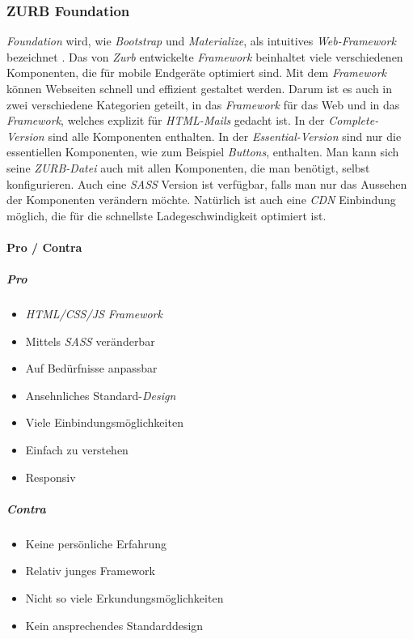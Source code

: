 		\subsubsection{ZURB Foundation}
		\label{chapter:study-frontend-frameworks-foundation}
		\textit{Foundation} wird, wie \textit{Bootstrap} und \textit{Materialize}, als intuitives \textit{Web-Framework} bezeichnet \cite{foundation-intro}. Das von \textit{Zurb} entwickelte \textit{Framework} beinhaltet viele verschiedenen Komponenten, die für mobile Endgeräte optimiert sind. Mit dem \textit{Framework} können Webseiten schnell und effizient gestaltet werden. Darum ist es auch in zwei verschiedene Kategorien geteilt, in das \textit{Framework} für das Web und in das \textit{Framework}, welches explizit für \textit{HTML-Mails} gedacht ist. In der \textit{Complete-Version} sind alle Komponenten enthalten. In der \textit{Essential-Version} sind nur die essentiellen Komponenten, wie zum Beispiel \textit{Buttons}, enthalten. Man kann sich seine \textit{ZURB-Datei} auch mit allen Komponenten, die man benötigt, selbst konfigurieren. Auch eine \textit{SASS} Version ist verfügbar, falls man nur das Aussehen der Komponenten verändern möchte. Natürlich ist auch eine \textit{CDN} Einbindung möglich, die für die schnellste Ladegeschwindigkeit optimiert ist.
		\paragraph{Pro / Contra}
		\subparagraph{Pro}
		\begin{itemize}
			\item \textit{HTML/CSS/JS Framework}
			\item Mittels \textit{SASS} veränderbar
			\item Auf Bedürfnisse anpassbar
			\item Ansehnliches Standard-\textit{Design} 
			\item Viele Einbindungsmöglichkeiten
			\item Einfach zu verstehen
			\item Responsiv
		\end{itemize}
	\label{list:zurbpro}
		\subparagraph{Contra}
		\begin{itemize}
			\item Keine persönliche Erfahrung
			\item Relativ junges Framework
			\item Nicht so viele Erkundungsmöglichkeiten
			\item Kein ansprechendes Standarddesign
		\end{itemize}
	\label{list:zurbcontra}

